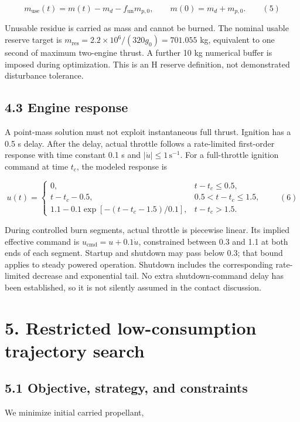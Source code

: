 \documentclass[
  11pt,
  a4paper,
]{article}
\begin{document}
\[ m_{\mathrm{use}}(t)=m(t)-m_d-f_{\mathrm{un}}m_{p,0},\qquad m(0)=m_d+m_{p,0}. \qquad (5) \]

Unusable residue is carried as mass and cannot be burned. The nominal
usable reserve target is
\(m_{\mathrm{res}}=2.2\times10^6/(320g_0)=701.055\) kg, equivalent to
one second of maximum two-engine thrust. A further 10 kg numerical
buffer is imposed during optimization. This is an H reserve definition,
not demonstrated disturbance tolerance.

\subsection{4.3 Engine response}\label{engine-response}

A point-mass solution must not exploit instantaneous full thrust.
Ignition has a 0.5 s delay. After the delay, actual throttle follows a
rate-limited first-order response with time constant 0.1 s and
\(|\dot u|\le1\,\mathrm{s^{-1}}\). For a full-throttle ignition command
at time \(t_c\), the modeled response is

\[
u(t)=\begin{cases}
0,&t-t_c\le0.5,\\
t-t_c-0.5,&0.5<t-t_c\le1.5,\\
1.1-0.1\exp[-(t-t_c-1.5)/0.1],&t-t_c>1.5.
\end{cases}\qquad (6)
\]

During controlled burn segments, actual throttle is piecewise linear.
Its implied effective command is \(u_{\mathrm{cmd}}=u+0.1\dot u\),
constrained between 0.3 and 1.1 at both ends of each segment. Startup
and shutdown may pass below 0.3; that bound applies to steady powered
operation. Shutdown includes the corresponding rate-limited decrease and
exponential tail. No extra shutdown-command delay has been established,
so it is not silently assumed in the contact discussion.

\section{5. Restricted low-consumption trajectory
search}\label{restricted-low-consumption-trajectory-search}

\subsection{5.1 Objective, strategy, and
constraints}\label{objective-strategy-and-constraints}

We minimize initial carried propellant,
\end{document}
